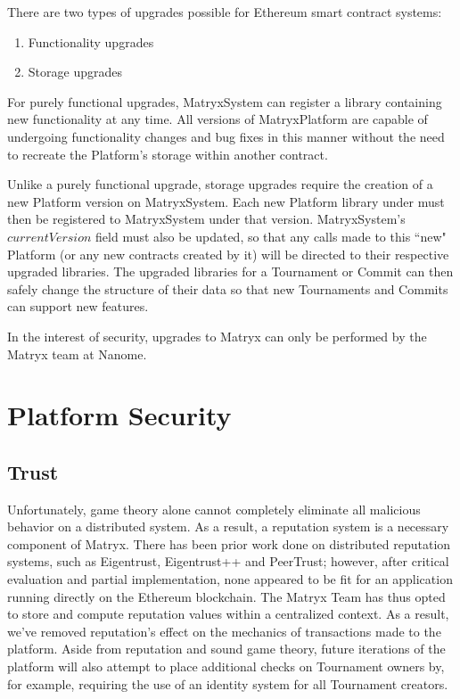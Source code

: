 \documentclass[a4paper, 10pt, conference]{ieeeconf}      %
\begin{document}
There are two types of upgrades possible for Ethereum smart contract systems:
\begin{enumerate}
\item Functionality upgrades
\item Storage upgrades
\end{enumerate}
For purely functional upgrades, MatryxSystem can register a library containing new functionality at any time. All versions of MatryxPlatform are capable of undergoing functionality changes and bug fixes in this manner without the need to recreate the Platform’s storage within another contract. 

Unlike a purely functional upgrade, storage upgrades require the creation of a new Platform version on MatryxSystem. Each new Platform library under must then be registered to MatryxSystem under that version. MatryxSystem's $currentVersion$ field must also be updated, so that any calls made to this ``new" Platform (or any new contracts created by it) will be directed to their respective upgraded libraries. The upgraded libraries for a Tournament or Commit can then safely change the structure of their data so that new Tournaments and Commits can support new features.

In the interest of security, upgrades to Matryx can only be performed by the Matryx team at Nanome.

\section{Platform Security}\label{platformsecurity}

\subsection{Trust}\label{trust}
Unfortunately, game theory alone cannot completely eliminate all malicious behavior on a distributed system. As a result, a reputation system is a necessary component of Matryx. There has been prior work done on distributed reputation systems, such as Eigentrust\cite{eigentrust}, Eigentrust++\cite{eigentrust++} and PeerTrust\cite{peertrust}; however, after critical evaluation and partial implementation, none appeared to be fit for an application running directly on the Ethereum blockchain. The Matryx Team has thus opted to store and compute reputation values within a centralized context. As a result, we've removed reputation's effect on the mechanics of transactions made to the platform.
Aside from reputation and sound game theory, future iterations of the platform will also attempt to place additional checks on Tournament owners by, for example, requiring the use of an identity system for all Tournament creators. 
\end{document}
